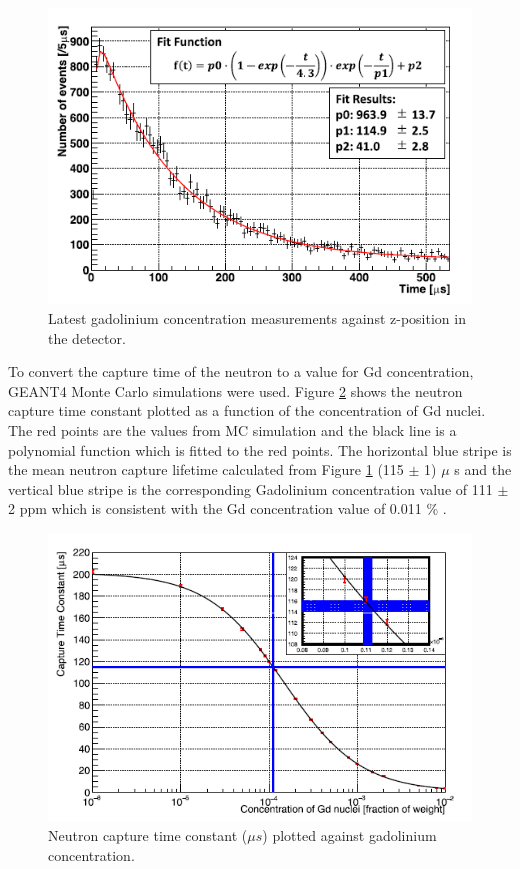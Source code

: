 \begin{figure}[H]
    \includegraphics[width=\textwidth]{Figures/ambe_time.png}
    \caption{Latest gadolinium concentration measurements against z-position in the detector.}
    \label{fig:ambe_time}
\end{figure}

To convert the capture time of the neutron to a value for Gd concentration, GEANT4 Monte Carlo simulations were used. Figure \ref{fig:capturetime_gdconc} shows the neutron capture time constant plotted as a function of the concentration of Gd nuclei. The red points are the values from MC simulation and the black line is a polynomial function which is fitted to the red points. The horizontal blue stripe is the mean neutron capture lifetime calculated from Figure \ref{fig:ambe_time} (115 $\pm$ 1) $\mu$ s and the vertical blue stripe is the corresponding Gadolinium concentration value of 111 $\pm$ 2 ppm which is consistent with the Gd concentration value of 0.011 \% \cite{abe_first_2021}.

\begin{figure}[H]
    \includegraphics[width=\textwidth]{Figures/capturetime_gdconc.png}
    \caption{Neutron capture time constant ($\mu s$) plotted against gadolinium concentration.}
    \label{fig:capturetime_gdconc}
\end{figure}



